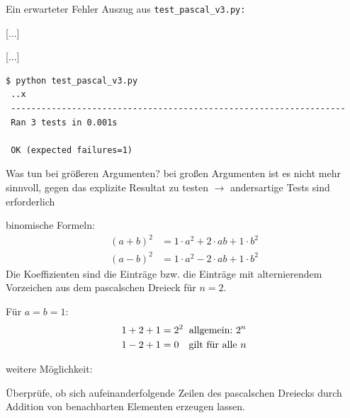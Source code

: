 \documentclass[t, utf8x, 10pt]{beamer}
\begin{document}
\begin{frame}[fragile]{Ein erwarteter Fehler}
 Auszug aus \texttt{test\_pascal\_v3.py:}
 \begin{small}
 
 [...]
 
 [...]
 

 \hrulefill

  \begin{lstlisting}[language={}]
 $ python test_pascal_v3.py
 ..x
 ------------------------------------------------------------------
 Ran 3 tests in 0.001s

 OK (expected failures=1)
  \end{lstlisting}
 \end{small}
\end{frame}


\begin{frame}{Was tun bei größeren Argumenten?}
bei großen Argumenten ist es nicht mehr sinnvoll, gegen das explizite Resultat
zu testen $\rightarrow$ andersartige Tests sind erforderlich

\vspace{\baselineskip}
binomische Formeln:
\begin{displaymath}
 \begin{aligned}
  (a+b)^2 &= 1\cdot a^2+2\cdot ab+1\cdot b^2\\
  (a-b)^2 &= 1\cdot a^2-2\cdot ab+1\cdot b^2
 \end{aligned}
\end{displaymath}
Die Koeffizienten sind die Einträge bzw. die Einträge mit alternierendem Vorzeichen
aus dem pascalschen Dreieck für $n=2$.

\vspace{\baselineskip}
Für $a=b=1$:
\begin{displaymath}
 \begin{aligned}
  1+2+1 &= 2^2\hspace{0.2truecm} \text{allgemein:}\ 2^n \\
  1-2+1 &= 0\hspace{0.35truecm}    \text{gilt für alle $n$} \\
 \end{aligned}
\end{displaymath}

\vspace{1\baselineskip}
weitere Möglichkeit:

Überprüfe, ob sich aufeinanderfolgende Zeilen des pascalschen Dreiecks durch
Addition von benachbarten Elementen erzeugen lassen.
\end{frame}
\end{document}
